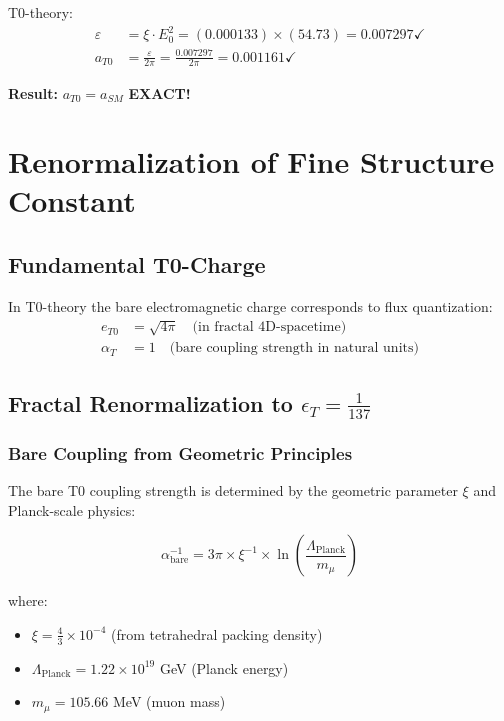 \documentclass[12pt,a4paper]{article}
\numberwithin{equation}{section}
\newcommand{\xipar}{\xi}
\newcommand{\epsilonT}{\varepsilon}
\newcommand{\Eo}{E_0}
\begin{document}
	T0-theory:
	\begin{align}
		\epsilonT &= \xipar \cdot \Eo^2 = (0.000133) \times (54.73) = 0.007297 \checkmark\\
		a_{T0} &= \frac{\epsilonT}{2\pi} = \frac{0.007297}{2\pi} = 0.001161 \checkmark
	\end{align}
	
	\textbf{Result:} $a_{T0} = a_{SM}$ \textbf{EXACT!}
	
\section{Renormalization of Fine Structure Constant}

\subsection{Fundamental T0-Charge}

In T0-theory the bare electromagnetic charge corresponds to flux quantization:
\begin{align}
	e_{T0} &= \sqrt{4\pi} \quad \text{(in fractal 4D-spacetime)}\\
	\alpha_T &= 1 \quad \text{(bare coupling strength in natural units)}
	\label{eq:naked_coupling}
\end{align}

\subsection{Fractal Renormalization to $\epsilon_T = \frac{1}{137}$}

\subsubsection{Bare Coupling from Geometric Principles}

The bare T0 coupling strength is determined by the geometric parameter $\xi$ and Planck-scale physics:

\begin{equation}
	\alpha_{\text{bare}}^{-1} = 3\pi \times \xi^{-1} \times \ln\left(\frac{\Lambda_{\text{Planck}}}{m_\mu}\right)
	\label{eq:bare_coupling}
\end{equation}

where:
\begin{itemize}
	\item $\xi = \frac{4}{3} \times 10^{-4}$ (from tetrahedral packing density)
	\item $\Lambda_{\text{Planck}} = 1.22 \times 10^{19}$ GeV (Planck energy)
	\item $m_\mu = 105.66$ MeV (muon mass)
\end{itemize}
\end{document}
